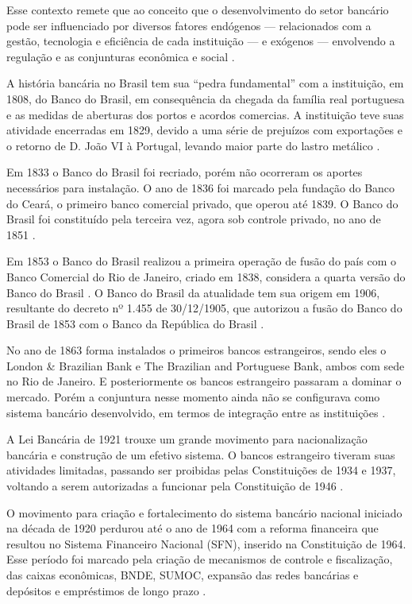 \documentclass[12pt,12pt,openright,oneside,a4paper,chapter=TITLE,section=TITLE,subsection=TITLE,subsubsection=TITLE,english,french,spanish,portugues,sumario=tradicional]{abntex2}
\begin{document}
Esse contexto remete que ao conceito que o desenvolvimento do setor bancário pode ser influenciado por diversos fatores endógenos --- relacionados com a gestão, tecnologia e eficiência de cada instituição --- e exógenos --- envolvendo a regulação e as conjunturas econômica e social \cite{rover:2011}.

A história bancária no Brasil tem sua ``pedra fundamental'' com a instituição, em 1808, do Banco do Brasil, em consequência da chegada da família real portuguesa e as medidas de aberturas dos portos e acordos comercias. A instituição teve suas atividade encerradas em 1829, devido a uma série de prejuízos com exportações e o retorno de D. João VI à Portugal, levando maior parte do lastro metálico \cite{camargo:2009}.

Em 1833 o Banco do Brasil foi recriado, porém não ocorreram os aportes necessários para instalação. O ano de 1836 foi marcado pela fundação do Banco do Ceará, o primeiro banco comercial privado, que operou até 1839. O Banco do Brasil foi constituído pela terceira vez, agora sob controle privado, no ano de 1851 \cite{camargo:2009}.

Em 1853 o Banco do Brasil realizou a primeira operação de fusão do país com o Banco Comercial do Rio de Janeiro, criado em 1838, considera a quarta versão do Banco do Brasil \cite{camargo:2009}. O Banco do Brasil da atualidade tem sua origem em 1906, resultante do decreto nº 1.455 de 30/12/1905, que autorizou a fusão do Banco do Brasil de 1853 com o Banco da República do Brasil \cite{camargo:2009} \cite{Lei:1455:1905}.

No ano de 1863 forma instalados o primeiros bancos estrangeiros, sendo eles o London \& Brazilian Bank e The Brazilian and Portuguese Bank, ambos com sede no Rio de Janeiro. E posteriormente os bancos estrangeiro passaram a dominar o mercado. Porém a conjuntura nesse momento ainda não se configurava como sistema bancário desenvolvido, em termos de integração entre as instituições \cite{camargo:2009}.

A Lei Bancária de 1921 trouxe um grande movimento para nacionalização bancária e construção de um efetivo sistema. O bancos estrangeiro tiveram suas atividades limitadas, passando ser proibidas pelas Constituições de 1934 e 1937, voltando a serem autorizadas a funcionar pela Constituição de 1946 \cite{camargo:2009}.

O movimento para criação e fortalecimento do sistema bancário nacional iniciado na década de 1920 perdurou até o ano de 1964 com a reforma financeira que resultou no Sistema Financeiro Nacional (SFN), inserido na Constituição de 1964. Esse período foi marcado pela criação de mecanismos de controle e fiscalização, das caixas econômicas, BNDE, SUMOC, expansão das redes bancárias e depósitos e empréstimos de longo prazo \cite{camargo:2009}.
\end{document}
